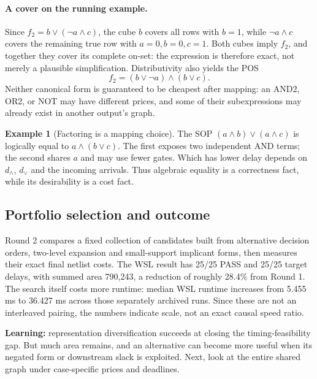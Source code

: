 \documentclass[a4paper,10pt]{article}
\theoremstyle{definition}
\newtheorem{example}[theorem]{Example}
\theoremstyle{remark}
\begin{document}
\paragraph{A cover on the running example.} Since $f_2=b\lor(\neg a\land c)$, the cube $b$ covers all rows with $b=1$, while $\neg a\land c$ covers the remaining true row with $a=0,b=0,c=1$. Both cubes imply $f_2$, and together they cover its complete on-set: the expression is therefore exact, not merely a plausible simplification. Distributivity also yields the POS
\[
 f_2=(b\lor\neg a)\land(b\lor c).
\]
Neither canonical form is guaranteed to be cheapest after mapping: an AND2, OR2, or NOT may have different prices, and some of their subexpressions may already exist in another output's graph.

\begin{example}[Factoring is a mapping choice]
The SOP $(a\land b)\lor(a\land c)$ is logically equal to $a\land(b\lor c)$. The first exposes two independent AND terms; the second shares $a$ and may use fewer gates. Which has lower delay depends on $d_{\land}$, $d_{\lor}$ and the incoming arrivals. Thus algebraic equality is a correctness fact, while its desirability is a cost fact.
\end{example}

\subsection{Portfolio selection and outcome}
Round 2 compares a fixed collection of candidates built from alternative decision orders, two-level expansion and small-support implicant forms, then measures their exact final netlist costs. The WSL result has 25/25 PASS and 25/25 target delays, with summed area 790,243, a reduction of roughly 28.4\% from Round 1. The search itself costs more runtime: median WSL runtime increases from 5.455 ms to 36.427 ms across those separately archived runs. Since these are not an interleaved pairing, the numbers indicate scale, not an exact causal speed ratio.

\begin{tcolorbox}[colback=ResearchSage!25,colframe=ResearchSage,title=Decision after Round 2]
\textbf{Learning:} representation diversification succeeds at closing the timing-feasibility gap. But much area remains, and an alternative can become more useful when its negated form or downstream slack is exploited. Next, look at the entire shared graph under case-specific prices and deadlines.
\end{tcolorbox}
\end{document}
